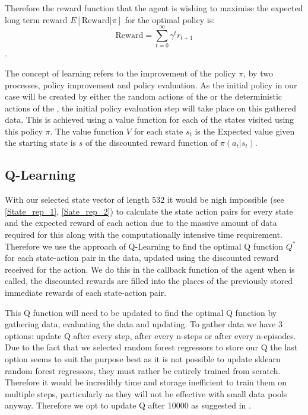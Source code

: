 Therefore the reward function that the agent is wishing to maximise the expected long term reward $E[\text{Reward}|\pi]$ for the optimal policy is: $$\text{Reward} = \sum_{t=0}^{\infty} \gamma^t r_{t+1}$$. 

The concept of learning refers to the improvement of the policy $\pi$, by two processes, policy improvement and policy evaluation. As the initial policy in our case will be created by either the random actions of the  or the deterministic actions of the , the initial policy evaluation step will take place on this gathered data.  This is achieved using a value function for each of the states visited using this policy $\pi$. The value function $V$ for each state $s_t$ is the Expected value given the starting state is $s$ of the discounted reward function of $\pi(a_t|s_t)$.

	\subsection{Q-Learning}
	With our selected state vector of length 532 it would be nigh impossible (see \ref{State_rep_1}, \ref{Sate_rep_2}) to calculate the state action pairs for every state and the expected reward of each action due to the massive amount of data required for this along with the computationally intensive time requirement. Therefore we use the approach of Q-Learning to find the optimal Q function $Q^*$ for each state-action pair in the data, updated using the discounted reward received for the action. We do this in the callback function of the agent when  is called, the discounted rewards are filled into the places of the previously stored immediate rewards of each state-action pair. 
	
	This Q function will need to be updated to find the optimal Q function by gathering data, evaluating the data and updating. To gather data we have 3 options: update Q after every step, after every n-steps or after every n-episodes. Due to the fact that we selected random forest regressors to store our Q the last option seems to suit the purpose best as it is not possible to update sklearn random forest regressors, they must rather be entirely trained from scratch. Therefore it would be incredibly time and storage inefficient to train them on multiple steps, particularly as they will not be effective with small data pools anyway. Therefore we opt to update Q after 10000 as suggested in \cite{paper}.
	
